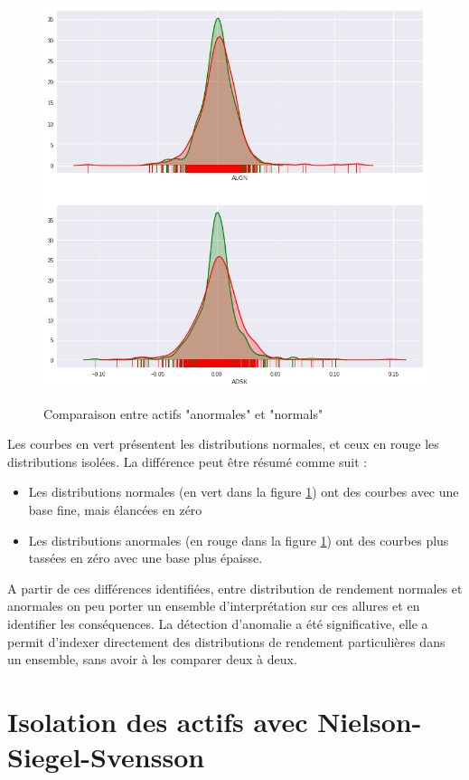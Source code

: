 \begin{figure}[H]
\centering
\caption{Comparaison entre actifs "anormales" et "normals"}
   \includegraphics[scale=0.7]{img/anomalie_vs_normal.png}
 \label{anorm}
\end{figure}

Les courbes en vert présentent les distributions normales, et ceux en rouge les distributions isolées. La différence peut être résumé  comme suit :
\begin{itemize}
\item Les distributions normales (en vert dans la figure \ref{anorm}) ont des courbes avec une base fine, mais élancées en zéro
\item  Les distributions anormales (en rouge dans la figure \ref{anorm}) ont des courbes plus tassées en zéro avec une base plus épaisse.
\end{itemize}

A partir de ces différences identifiées, entre distribution de rendement normales et anormales on peu porter un ensemble d'interprétation sur ces allures et en identifier les conséquences.
La détection d'anomalie a été significative, elle a permit d'indexer directement des distributions de rendement particulières dans un ensemble, sans avoir à les comparer deux à deux.

\section{Isolation des actifs avec Nielson-Siegel-Svensson}


